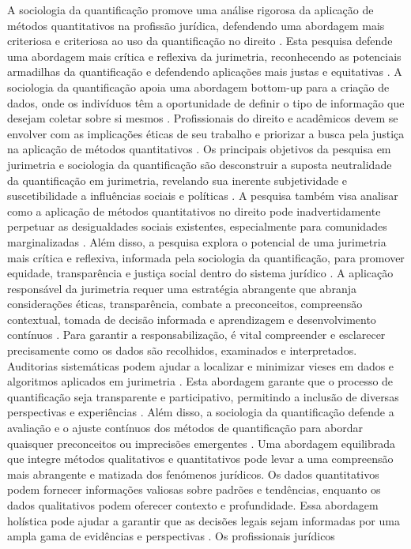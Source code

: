 \begin{agradecimentos}
    A sociologia da quantificação promove uma análise rigorosa da aplicação de métodos quantitativos na profissão jurídica, defendendo uma abordagem mais criteriosa e criteriosa ao uso da quantificação no direito \cite{10.1007/s11186-021-09453-1,salais2016quantificação}. Esta pesquisa defende uma abordagem mais crítica e reflexiva da jurimetria, reconhecendo as potenciais armadilhas da quantificação e defendendo aplicações mais justas e equitativas \cite{10.1590/dados.2022.65.3.267}. A sociologia da quantificação apoia uma abordagem bottom-up para a criação de dados, onde os indivíduos têm a oportunidade de definir o tipo de informação que desejam coletar sobre si mesmos \cite{10.1590/dados.2022.65.3.267}. Profissionais do direito e acadêmicos devem se envolver com as implicações éticas de seu trabalho e priorizar a busca pela justiça na aplicação de métodos quantitativos \cite{10.1007/s11186-021-09453-1,10.3390/fi9040068}. Os principais objetivos da pesquisa em jurimetria e sociologia da quantificação são desconstruir a suposta neutralidade da quantificação em jurimetria, revelando sua inerente subjetividade e suscetibilidade a influências sociais e políticas \cite{10.1007/s11186-021-09453-1,10.3390/ fi9040068}. A pesquisa também visa analisar como a aplicação de métodos quantitativos no direito pode inadvertidamente perpetuar as desigualdades sociais existentes, especialmente para comunidades marginalizadas \cite{10.1007/s11186-021-09453-1,10.3390/fi9040068}. Além disso, a pesquisa explora o potencial de uma jurimetria mais crítica e reflexiva, informada pela sociologia da quantificação, para promover equidade, transparência e justiça social dentro do sistema jurídico \cite{10.1007/s11186-021-09453-1,10.3390/ fi9040068}. A aplicação responsável da jurimetria requer uma estratégia abrangente que abranja considerações éticas, transparência, combate a preconceitos, compreensão contextual, tomada de decisão informada e aprendizagem e desenvolvimento contínuos \cite{10.1590/dados.2022.65.3.267,inthelawviewmetadatacitationsimilarpapers2014}. Para garantir a responsabilização, é vital compreender e esclarecer precisamente como os dados são recolhidos, examinados e interpretados. Auditorias sistemáticas podem ajudar a localizar e minimizar vieses em dados e algoritmos aplicados em jurimetria \cite{10.1590/dados.2022.65.3.267,inthelawviewmetadatacitationsimilarpapers2014}. Esta abordagem garante que o processo de quantificação seja transparente e participativo, permitindo a inclusão de diversas perspectivas e experiências \cite{salais2016}. Além disso, a sociologia da quantificação defende a avaliação e o ajuste contínuos dos métodos de quantificação para abordar quaisquer preconceitos ou imprecisões emergentes \cite{salais2016}. Uma abordagem equilibrada que integre métodos qualitativos e quantitativos pode levar a uma compreensão mais abrangente e matizada dos fenómenos jurídicos. Os dados quantitativos podem fornecer informações valiosas sobre padrões e tendências, enquanto os dados qualitativos podem oferecer contexto e profundidade. Essa abordagem holística pode ajudar a garantir que as decisões legais sejam informadas por uma ampla gama de evidências e perspectivas \cite{10.1590/dados.2022.65.3.267,10.1057/s41599-020-00557-0}. Os profissionais jurídicos 
\end{agradecimentos}
